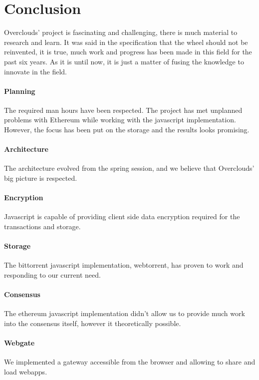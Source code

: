 
\section{Conclusion}
Overclouds' project is fascinating and challenging, there is much material to research and learn. It was said in the specification that the wheel should not be reinvented, it is true, much work and progress has been made in this field for the past six years. As it is until now, it is just a matter of fusing the knowledge to innovate in the field.

\paragraph{Planning}
The required man hours have been respected. The project has met unplanned problems with Ethereum while working with the javascript implementation. However, the focus has been put on the storage and the results looks promising.

\paragraph{Architecture}
The architecture evolved from the spring session, and we believe that Overclouds' big picture is respected.

\paragraph{Encryption}
Javascript is capable of providing client side data encryption required for the transactions and storage.

\paragraph{Storage}
The bittorrent javascript implementation, webtorrent, has proven to work and responding to our current need.

\paragraph{Consensus} The ethereum javascript implementation didn't allow us to provide much work into the consensus itself, however it theoretically possible.

\paragraph{Webgate} We implemented a gateway accessible from the browser and allowing to share and load webapps.

